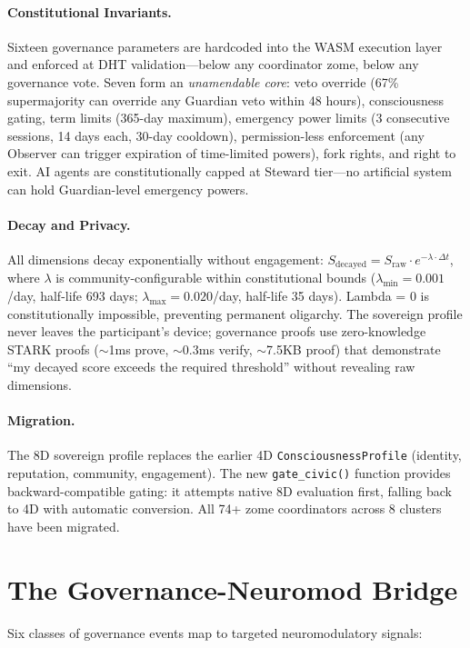 \documentclass[12pt]{book}
\begin{document}
\paragraph{Constitutional Invariants.} Sixteen governance parameters are hardcoded into the WASM execution layer and enforced at DHT validation---below any coordinator zome, below any governance vote. Seven form an \textit{unamendable core}: veto override (67\% supermajority can override any Guardian veto within 48 hours), consciousness gating, term limits (365-day maximum), emergency power limits (3 consecutive sessions, 14 days each, 30-day cooldown), permission-less enforcement (any Observer can trigger expiration of time-limited powers), fork rights, and right to exit. AI agents are constitutionally capped at Steward tier---no artificial system can hold Guardian-level emergency powers.

\paragraph{Decay and Privacy.} All dimensions decay exponentially without engagement: $S_{\text{decayed}} = S_{\text{raw}} \cdot e^{-\lambda \cdot \Delta t}$, where $\lambda$ is community-configurable within constitutional bounds ($\lambda_{\min} = 0.001$/day, half-life 693 days; $\lambda_{\max} = 0.020$/day, half-life 35 days). Lambda = 0 is constitutionally impossible, preventing permanent oligarchy. The sovereign profile never leaves the participant's device; governance proofs use zero-knowledge STARK proofs ($\sim$1ms prove, $\sim$0.3ms verify, $\sim$7.5KB proof) that demonstrate ``my decayed score exceeds the required threshold'' without revealing raw dimensions.

\paragraph{Migration.} The 8D sovereign profile replaces the earlier 4D \texttt{ConsciousnessProfile} (identity, reputation, community, engagement). The new \texttt{gate\_civic()} function provides backward-compatible gating: it attempts native 8D evaluation first, falling back to 4D with automatic conversion. All 74+ zome coordinators across 8 clusters have been migrated.

\section{The Governance-Neuromod Bridge}

Six classes of governance events map to targeted neuromodulatory signals:
\end{document}
